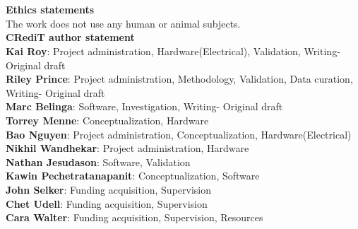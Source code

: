 \documentclass[11pt, letterpaper]{article}
\begin{document}

\section*{}
\noindent
\textbf{Ethics statements}\\

\noindent
The work does not use any human or animal subjects.\\


\noindent
\textbf{CRediT author statement}\\

\noindent
\textbf{Kai Roy}: Project administration, Hardware(Electrical), Validation, Writing- Original draft \\
\noindent
\textbf{Riley Prince}: Project administration, Methodology, Validation, Data curation, Writing- Original draft \\
\noindent
\textbf{Marc Belinga}: Software, Investigation, Writing- Original draft \\
\noindent
\textbf{Torrey Menne}: Conceptualization, Hardware\\
\noindent
\textbf{Bao Nguyen}: Project administration, Conceptualization, Hardware(Electrical)\\
\noindent
\textbf{Nikhil Wandhekar}: Project administration, Hardware\\
\noindent
\textbf{Nathan Jesudason}: Software, Validation \\
\noindent
\textbf{Kawin Pechetratanapanit}: Conceptualization, Software \\
\noindent
\textbf{John Selker}: Funding acquisition, Supervision \\
\noindent
\textbf{Chet Udell}: Funding acquisition, Supervision \\
\noindent
\textbf{Cara Walter}: Funding acquisition, Supervision, Resources \\
\end{document}
